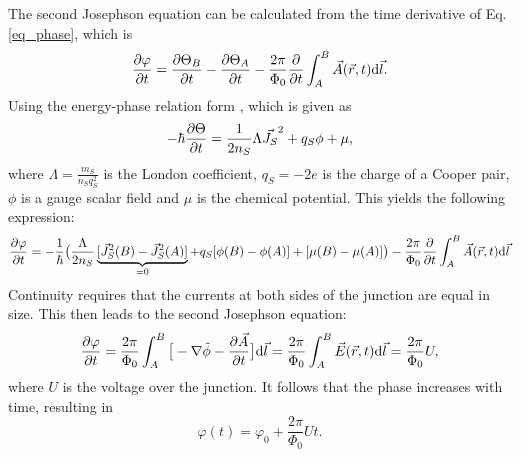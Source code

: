 \documentclass[a4paper,10pt]{article}
\newcommand{\dif}{\mathrm{d}}
\begin{document}
The second Josephson equation can be calculated from the time derivative of Eq. \ref{eq_phase}, which is 
\begin{equation}
    \pdv{\varphi}{t} = \pdv{\Theta_B}{t} - \pdv{\Theta_A}{t} - \frac{2 \pi}{\Phi_0} \pdv{}{t} \int^B_A \vec{A}(\vec{r},t) \dif \vec{l}.
\end{equation}
Using the energy-phase relation form \cite{grossmarx}, which is given as 
\begin{equation}
    -\hbar \pdv{\Theta}{t} = \frac{1}{2 n_S} \Lambda \vec{J_S}^2 + q_S \phi + \mu,
\end{equation}
where $\Lambda = \frac{m_S}{n_S q_S^2}$ is the London coefficient, $q_S = -2 e$ is the charge of a Cooper pair, $\phi$ is a gauge scalar field and $\mu$ is the chemical potential. This yields the following expression:
\begin{equation}
    \pdv{\varphi}{t} = - \frac{1}{\hbar} \big( \frac{\Lambda}{2 n_S} \underbrace{[\vec{J}_S^2(B) - \vec{J}_S^2(A)]}_{ = 0} + q_S [\phi(B) - \phi(A)] + [\mu(B) - \mu(A)] \big) -  \frac{2 \pi}{\Phi_0} \pdv{}{t} \int^B_A \vec{A}(\vec{r},t) \dif \vec{l}
\end{equation}
Continuity requires that the currents at both sides of the junction are equal in size. This then leads to the second Josephson equation:
\begin{equation}
\pdv{\varphi}{t} = \frac{2 \pi}{\Phi_0} \int^B_A \big[ - \nabla \tilde{\phi} - \pdv{\vec{A}}{t} \big] \dif \vec{l} = \frac{2 \pi}{\Phi_0} \int^B_A \vec{E}(\vec{r},t) \dif \vec{l} = \frac{2 \pi}{\Phi_0} U,
\end{equation}
where $U$ is the voltage over the junction. It follows that the phase increases with time, resulting in 
\begin{equation}
    \varphi(t) = \varphi_0 + \frac{2 \pi}{\Phi_0} U t.
    \label{eq_josephson_2}
\end{equation}
\end{document}
